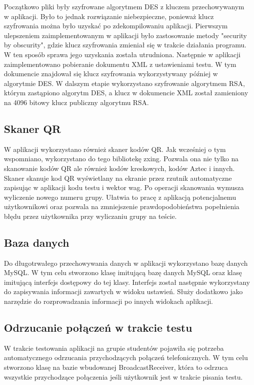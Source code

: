 \documentclass{report}
\begin{document}
		Początkowo pliki były szyfrowane algorytmem DES z kluczem przechowywanym w aplikacji. Było to jednak rozwiązanie niebezpieczne, ponieważ klucz szyfrowania można było uzyskać po zdekompilowaniu aplikacji. Pierwszym ulepszeniem zaimplementowanym w aplikacji było zastosowanie metody "security by obscurity", gdzie klucz szyfrowania zmieniał się w trakcie działania programu. W ten sposób sprawa jego uzyskania została utrudniona. Następnie w aplikacji zaimplementowano pobieranie dokumentu XML z ustawieniami testu. W tym dokumencie znajdował się klucz szyfrowania wykorzystywany później w algorytmie DES. W dalszym etapie wykorzystano szyfrowanie algorytmem RSA, którym zastąpiono algorytm DES, a klucz w dokumencie XML został zamieniony na 4096 bitowy klucz publiczny algorytmu RSA.
	
		\subsection{Skaner QR}
		
		W aplikacji wykorzystano również skaner kodów QR. Jak wcześniej o tym wspomniano, wykorzystano do tego bibliotekę zxing. Pozwala ona nie tylko na skanowanie kodów QR ale również kodów kreskowych, kodów Aztec i innych. Skaner skanuje kod QR wyświetlany na ekranie przez rzutnik automatyczne zapisując w aplikacji kodu testu i wektor wag. Po operacji skanowania wymusza wyliczenie nowego numeru grupy. Ułatwia to pracę z aplikacją potencjalnemu użytkownikowi oraz pozwala na zmniejszenie prawdopodobieństwa popełnienia błędu przez użytkownika przy wyliczaniu grupy na teście.
		
		\subsection{Baza danych}
		
		Do długotrwałego przechowywania danych w aplikacji wykorzystano bazę danych MySQL. W tym celu stworzono klasę imitującą bazę danych MySQL oraz klasę imitującą interfejs dostępowy do tej klasy. Interfejs został następnie wykorzystany do zapisywania informacji zawartych w widoku ustawień. Służy dodatkowo jako narzędzie do rozprowadzania informacji po innych widokach aplikacji.
		
		\subsection{Odrzucanie połączeń w trakcie testu}
		
		W trakcie testowania aplikacji na grupie studentów pojawiła się potrzeba automatycznego odrzucania przychodzących połączeń telefonicznych. W tym celu stworzono klasę na bazie wbudowanej BroadcastReceiver, która to odrzuca wszystkie przychodzące połączenia jeśli użytkownik jest w trakcie pisania testu.
		
\end{document}
